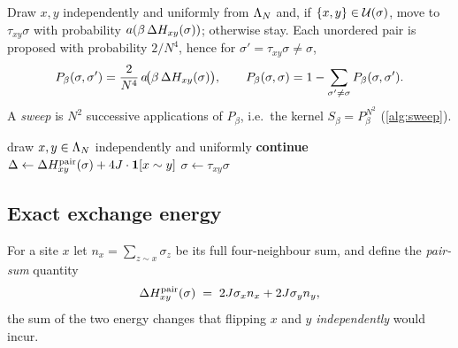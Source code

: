 \begin{definition}\label{def:kernel}
Draw $x,y$ independently and uniformly from $\Lambda_N$ and, if $\{x,y\}\in\mathcal{U}(\sigma)$, move to $\tau_{xy}\sigma$ with probability $a(\beta\,\Delta H_{xy}(\sigma))$; otherwise stay. Each unordered pair is proposed with probability $2/N^4$, hence for $\sigma'=\tau_{xy}\sigma\neq\sigma$,
\begin{equation}
P_\beta(\sigma,\sigma')=\frac{2}{N^4}\,a\!\big(\beta\,\Delta H_{xy}(\sigma)\big),\qquad
P_\beta(\sigma,\sigma)=1-\sum_{\sigma'\ne\sigma}P_\beta(\sigma,\sigma').
\label{eq:kernel}
\end{equation}
A \emph{sweep} is $N^2$ successive applications of $P_\beta$, i.e.\ the kernel $S_\beta=P_\beta^{N^2}$ (\cref{alg:sweep}).
\end{definition}

\begin{algorithm}[t]
\caption{One Monte Carlo sweep of the exchange sampler (as implemented in \texttt{core.kawasaki\_step}).}\label{alg:sweep}
\begin{algorithmic}[1]
  \State draw $x,y\in\Lambda_N$ independently and uniformly
   \textbf{continue} \EndIf
  \State $\Delta\gets \Delta H^{\mathrm{pair}}_{xy}(\sigma)+4J\cdot\mathbf{1}[x\sim y]$ 
   \State $\sigma\gets\tau_{xy}\sigma$ \EndIf
\EndFor
\end{algorithmic}
\end{algorithm}

\subsection{Exact exchange energy}
For a site $x$ let $n_x=\sum_{z\sim x}\sigma_z$ be its full four-neighbour sum, and define the \emph{pair-sum} quantity
\begin{equation}
\Delta H^{\mathrm{pair}}_{xy}(\sigma)\;=\;2J\sigma_x n_x+2J\sigma_y n_y,
\label{eq:pair}
\end{equation}
the sum of the two energy changes that flipping $x$ and $y$ \emph{independently} would incur.

